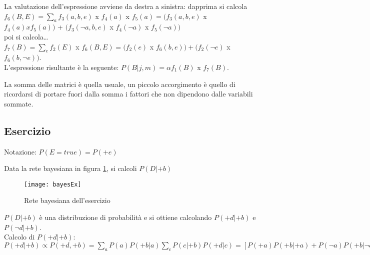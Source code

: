 La valutazione dell'espressione avviene da destra a sinistra: dapprima 
si calcola $f_6(B,E) = \sum_a f_3(a,b,e)$ x $f_4(a)$ x $f_5(a) = (f_3(a,b,e)$ x
$f_4(a) x f_5(a))$ + $(f_3(\neg a,b,e)$ x $f_4(\neg a)$ x $f_5(\neg a))$\\

poi si calcola\dots\\

$f_7(B) = \sum_e f_2(E)$ x $f_6(B,E) = (f_2(e)$ x $f_6(b,e)) + (f_2(\neg e)$ x
$f_6(b, \neg e))$.\\

L'espressione risultante è la seguente: $P(B|j,m) = \alpha f_1(B)$ x $f_7(B)$.

La somma delle matrici è quella usuale, un piccolo accorgimento è quello di
ricordarsi di portare fuori dalla somma i fattori che non dipendono dalle
variabili sommate.

\subsection{Esercizio}

Notazione: $P(E = true) = P(+e)$

Data la rete bayesiana in figura \ref{fig:bayesEx}, si calcoli $P(D|+b)$

\begin{figure}[H]
\centering
\texttt{[image: bayesEx]}
\caption{Rete bayesiana dell'esercizio}
\label{fig:bayesEx}
\end{figure}

$P(D|+b)$ è una distribuzione di probabilità e si ottiene calcolando $P(+d|+b)$ e
$P(\neg d|+b)$.\\

Calcolo di $P(+d|+b)$:\\

$P(+d|+b) \propto P(+d, +b) = \sum_a P(a) P(+b|a) \sum_c P(c|+b) P(+d|c) =
[P(+a)P(+b|+a) + P(\neg a) P(+b|\neg a)][P(+c|+b) P(+d|+c) + P(\neg c|+b)
P(+d|\neg c)] = (0.9\cdot 0.7 + 0.1\cdot 0.2)\cdot (0.2\cdot 0.6 + 0.8\cdot 0.9) =
0.546$

